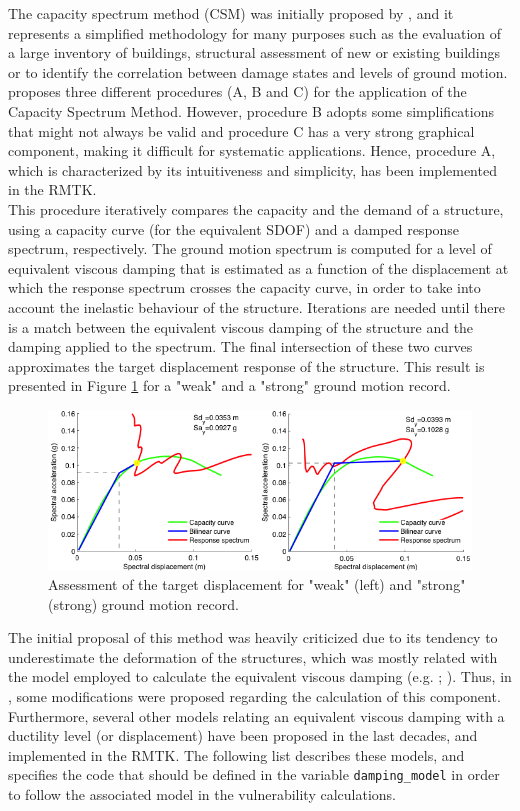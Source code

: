 The capacity spectrum method (CSM) was initially proposed by \citep{FreemanEtAl1975}, and it represents a simplified methodology for many purposes such as the evaluation of a large inventory of buildings, structural assessment of new or existing buildings or to identify the correlation between damage states and levels of ground motion. \cite{ATC1996} proposes three different procedures (A, B and C) for the application of the Capacity Spectrum Method. However, procedure B adopts some simplifications that might not always be valid and procedure C has a very strong graphical component, making it difficult for systematic applications. Hence, procedure A, which is characterized by its intuitiveness and simplicity, has been implemented in the RMTK.\\

This procedure iteratively compares the capacity and the demand of a structure, using a capacity curve (for the equivalent SDOF) and a damped response spectrum, respectively. The ground motion spectrum is computed for a level of equivalent viscous damping that is estimated as a function of the displacement at which the response spectrum crosses the capacity curve, in order to take into account the inelastic behaviour of the structure. Iterations are needed until there is a match between the equivalent viscous damping of the structure and the damping applied to the spectrum. The final intersection of these two curves approximates the target displacement response of the structure. This result is presented in Figure \ref{fig:per_point} for a "weak" and a "strong" ground motion record. \\

\begin{figure}[htb]
  \centering
      \includegraphics[width=12cm]{Figures/performance_points.png}
  \caption{Assessment of the target displacement for "weak" (left) and "strong" (strong) ground motion record.}
  \label{fig:per_point}
\end{figure}

The initial proposal of this method was heavily criticized due to its tendency to underestimate the deformation of the structures, which was mostly related with the model employed to calculate the equivalent viscous damping (e.g. \cite{Fajfar1999}; \cite{ChopraGoel2010}). Thus, in \cite{FEMA4402005}, some modifications were proposed regarding the calculation of this component. Furthermore, several other models relating an equivalent viscous damping with a ductility level (or displacement) have been proposed in the last decades, and implemented in the RMTK. The following list describes these models, and specifies the code that should be defined in the variable \verb=damping_model= in order to follow the associated model in the vulnerability calculations.\\

